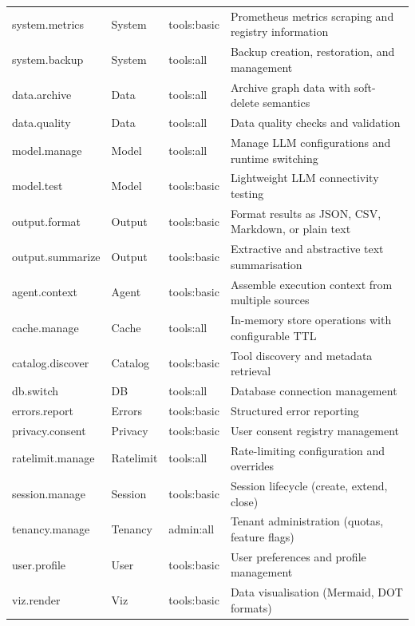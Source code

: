 \documentclass[a4paper]{sapthesis}
\begin{document}
{\begin{longtable}{@{}l l l p{4.0cm}@{}}
system.metrics & System & tools:basic & Prometheus metrics scraping and registry information \\
system.backup  & System & tools:all   & Backup creation, restoration, and management \\
\hline
data.archive & Data & tools:all   & Archive graph data with soft-delete semantics \\
data.quality & Data & tools:all   & Data quality checks and validation \\
\hline
model.manage & Model & tools:all   & Manage LLM configurations and runtime switching \\
model.test   & Model & tools:basic & Lightweight LLM connectivity testing \\
\hline
output.format    & Output & tools:basic & Format results as JSON, CSV, Markdown, or plain text \\
output.summarize & Output & tools:basic & Extractive and abstractive text summarisation \\
\hline
agent.context    & Agent     & tools:basic & Assemble execution context from multiple sources \\
cache.manage     & Cache     & tools:all   & In-memory store operations with configurable TTL \\
catalog.discover & Catalog   & tools:basic & Tool discovery and metadata retrieval \\
db.switch        & DB        & tools:all   & Database connection management \\
errors.report    & Errors    & tools:basic & Structured error reporting \\
privacy.consent  & Privacy   & tools:basic & User consent registry management \\
ratelimit.manage & Ratelimit & tools:all   & Rate-limiting configuration and overrides \\
session.manage   & Session   & tools:basic & Session lifecycle (create, extend, close) \\
tenancy.manage   & Tenancy   & admin:all   & Tenant administration (quotas, feature flags) \\
user.profile     & User      & tools:basic & User preferences and profile management \\
viz.render       & Viz       & tools:basic & Data visualisation (Mermaid, DOT formats) \\
\hline
\end{longtable}
}


\end{document}
